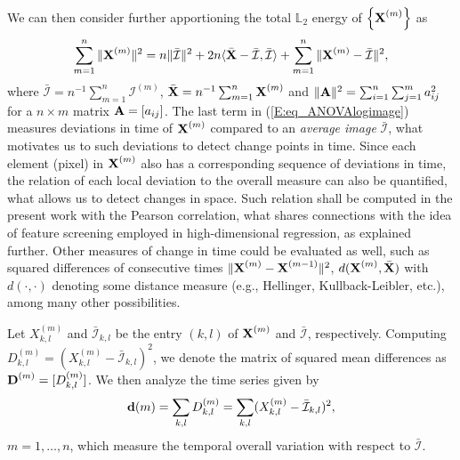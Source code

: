 \documentclass[journal]{IEEEtran}
\newcommand{\vA}{{\textbf A}}
\newcommand{\vD}{{\textbf D}}
\newcommand{\vd}{{\textbf d}}
\newcommand{\vX}{{\textbf X}}
\begin{document}
We can then consider further apportioning the total $\mathbb{L}_2$ energy of $\left\{\vX^{(m)}\right\}$ as
\begin{equation} 
\sum_{m=1}^n\|\vX^{(m)}\|^2 = n\|\bar{\mathcal{I}}\|^2+2n\langle\bar{\vX}-\bar{\mathcal{I}},\bar{\mathcal{I}}\rangle+\sum_{m=1}^n\|\mathcal \vX^{(m)}-\bar{\mathcal{I}}\|^2,\label{E:eq_ANOVAlogimage}
\end{equation}
where $\bar{\mathcal{I}}=n^{-1}\sum_{m=1}^n\mathcal{I}^{(m)}$, $\bar{\vX}=n^{-1}\sum_{m=1}^n\vX^{(m)}$ and $\|\vA\|^2=\sum_{i=1}^n\sum_{j=1}^m a_{ij}^2$ for a $n\times m$ matrix $\vA=[a_{ij}]$. The last term in (\ref{E:eq_ANOVAlogimage}) measures deviations in time of $\vX^{(m)}$ compared to an {\it average image} $\bar{\mathcal{I}}$, what motivates us to such deviations to detect change points in time. Since each element (pixel) in $\vX^{(m)}$ also has a corresponding sequence of deviations in time, the relation of each local deviation to the overall measure can also be quantified, what allows us to detect changes in space. Such relation shall be computed in the present work with the Pearson correlation, what shares connections with the idea of feature screening employed in high-dimensional regression, as explained further. Other measures of change in time could be evaluated as well, such as squared differences of consecutive times $\|\mathcal \vX^{(m)}-\vX^{(m-1)}\|^2$, $d(\vX^{(m)},\bar{\vX})$ with $d(\cdot,\cdot)$ denoting some distance measure (e.g., Hellinger, Kullback-Leibler, etc.), among many other possibilities.

Let $X_{k,l}^{(m)}$ and $\bar{\mathcal{I}}_{k,l}$ be the entry $(k,l)$ of $\vX^{(m)}$ and $\bar{\mathcal{I}}$, respectively. Computing $D_{k,l}^{(m)}=(X_{k,l}^{(m)}-\bar{\mathcal{I}}_{k,l})^2$, we denote the matrix of squared mean differences as $\vD^{(m)} = [D_{k,l}^{(m)}]$. We then 
analyze the time series given by
\begin{equation} 
\vd(m)= \sum_{k,l}D_{k,l}^{(m)} = \sum_{k,l}(X_{k,l}^{(m)} - \bar{\mathcal{I}}_{k,l})^2,
\label{E:eq_defdm}
\end{equation}
$m=1,\ldots,n$, which measure the temporal overall variation with respect to $\bar{\mathcal{I}}$.
\end{document}
